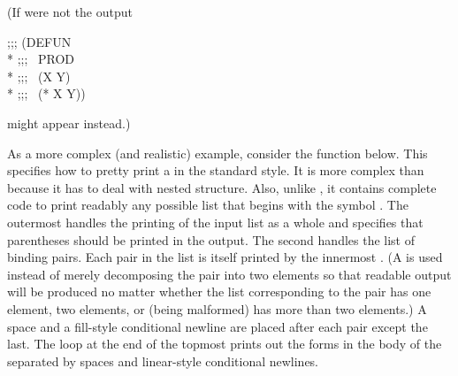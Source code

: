 (If  were not  the output
\begin{lisp}
;;; (DEFUN \\*
;;; ~PROD \\*
;;; ~(X Y) \\*
;;; ~(* X Y))
\end{lisp}
might appear instead.)

As a more complex (and realistic) example, consider the function
 below.  This specifies how to pretty print a  in the
standard style.  It is more complex than  because it has
to deal with nested structure.  Also, unlike , it contains
complete code to print readably any possible list that begins with the
symbol .  The outermost  handles the
printing of the input list as a whole and specifies that parentheses should
be printed in the output.  The second  handles the
list of binding pairs.  Each pair in the list is itself printed by the
innermost .  (A  is used instead of
merely decomposing the pair into two elements so that readable output will
be produced no matter whether the list corresponding to the pair has one
element, two elements, or (being malformed) has more than two elements.)  A
space and a fill-style conditional newline are placed after each pair
except the last.  The loop at the end of the topmost
 prints out the forms in the body of the 
separated by spaces and linear-style conditional newlines.

